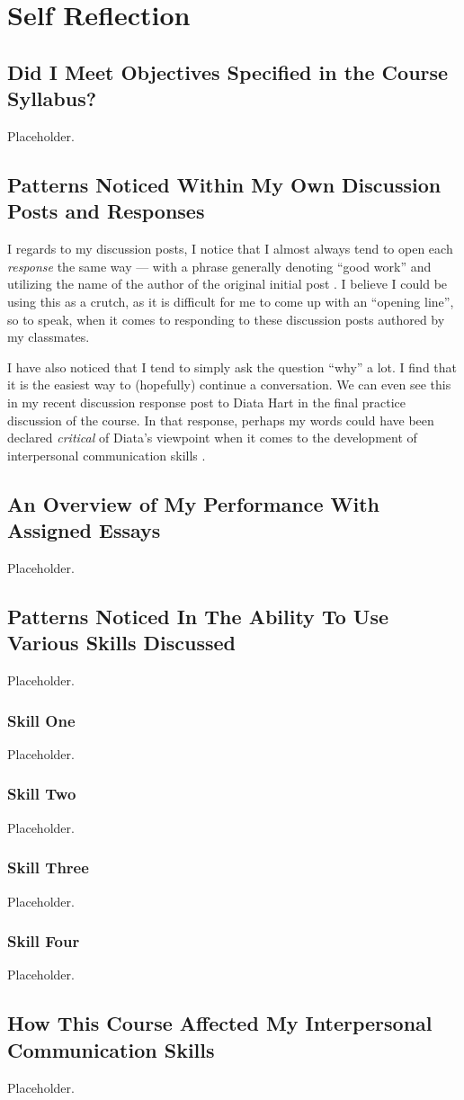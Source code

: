 
\section{Self Reflection}
\subsection{Did I Meet Objectives Specified in the Course Syllabus?}
  Placeholder.

\subsection{Patterns Noticed Within My Own Discussion Posts and Responses}
  I regards to my discussion posts, I notice that I almost always tend to open
    each \textit{response} the same way --- with a phrase generally denoting
    ``good work'' and utilizing the name of the author of the original initial
    post \parencite{%
    hellwig_julayne_2020,hellwig_cherylee_2020,hellwig_kristyna_2020%
    }. I believe I could be using this as a crutch, as it is difficult for me
    to come up with an ``opening line'', so to speak, when it comes to
    responding to these discussion posts authored by my classmates.

  I have also noticed that I tend to simply ask the question ``why'' a lot.
    I find that it is the easiest way to (hopefully) continue a conversation.
    We can even see this in my recent discussion response post to Diata Hart
    in the final practice discussion of the course. In that response, perhaps
    my words could have been declared \textit{critical} of Diata's viewpoint
    when it comes to the development of interpersonal communication skills
    \parencite{hellwig_diata_2020}.

\subsection{An Overview of My Performance With Assigned Essays}
  Placeholder.

\subsection{Patterns Noticed In The Ability To Use Various Skills Discussed}
  Placeholder.
  \subsubsection{Skill One}
    Placeholder.
  \subsubsection{Skill Two}
    Placeholder.
  \subsubsection{Skill Three}
    Placeholder.
  \subsubsection{Skill Four}
    Placeholder.

\subsection{How This Course Affected My Interpersonal Communication Skills}
  Placeholder.
